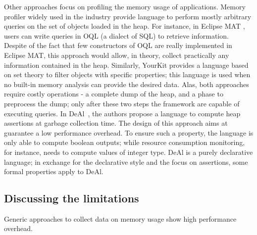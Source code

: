 Other approaches focus on profiling the memory usage of applications.
Memory profiler widely used in the industry provide language to perform mostly arbitrary queries on the set of objects loaded in the heap.
For instance, in Eclipse MAT \cite{}, users can write queries in OQL (a dialect of SQL) to retrieve information.
Despite of the fact that few constructors of OQL are really implemented in Eclipse MAT, this approach would allow, in theory, collect practically any information contained in the heap.
Similarly, YourKit \cite{} provides a language based on set theory to filter objects with specific properties; this language is used when no built-in memory analysis can provide the desired data.
Alas, both approaches require costly operations - a complete dump of the heap, and a phase to preprocess the dump; only after these two steps the framework are capable of executing queries.
In DeAl~\cite{Reichenbach:2010:GCE:1869459.1869482}, the authors propose a language to compute heap assertions at garbage collection time.
The design of this approach aims at guarantee a low performance overhead.
To ensure such a property, the language is only able to compute boolean outputs; while resource consumption monitoring, for instance, needs to compute values of integer type.
DeAl is a purely declarative language; in exchange for the declarative style and the focus on assertions, some formal properties apply to DeAl. 

\subsection{Discussing the limitations}

Generic approaches to collect data on memory usage show high performance overhead.


